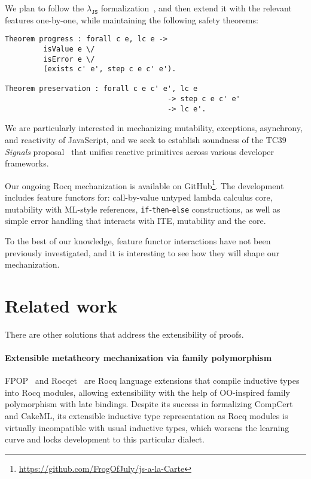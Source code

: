 \documentclass[sigplan,nonacm,review]{acmart}
\begin{document}

We plan to follow the $\lambda_{\texttt{JS}}$ formalization~\cite{guha2010essence},
and then extend it with the relevant features one-by-one,
while maintaining the following safety theorems:

\begin{lstlisting}[numbers=none, language=Coq]
Theorem progress : forall c e, lc e -> 
         isValue e \/ 
         isError e \/ 
         (exists c' e', step c e c' e').

Theorem preservation : forall c e c' e', lc e
                                      -> step c e c' e'
                                      -> lc e'.
\end{lstlisting}

We are particularly interested in mechanizing
mutability, exceptions, asynchrony, and reactivity of JavaScript, and we seek to establish soundness of the TC39 \emph{Signals} proposal~\cite{signals-proposal-t39} that unifies reactive primitives across various developer frameworks. 



Our ongoing Rocq mechanization is available on
GitHub\footnote{\url{https://github.com/FrogOfJuly/js-a-la-Carte}}. 
The development includes feature functors for: call-by-value untyped lambda calculus core, mutability with ML-style references, \texttt{if}-\texttt{then}-\texttt{else} constructions, as well as simple error handling that interacts with ITE, mutability and the core.

To the best of our knowledge, feature functor interactions have not been previously investigated, and it is interesting to see how they will shape our mechanization.

\section{Related work}

There are other solutions that address the extensibility of proofs. 


\paragraph{Extensible metatheory mechanization via family polymorphism} FPOP~\cite{jin2023extensible} and Rocqet~\cite{ebresafe2025certified} are Rocq language extensions that compile inductive types into Rocq modules, allowing extensibility with the help of OO-inspired family polymorphism with late bindings. 
%
%
%
%
Despite its success in formalizing CompCert and CakeML, its extensible inductive type representation as Rocq modules is virtually incompatible with usual inductive types, which worsens the learning curve and locks development to this particular dialect. 
\end{document}
